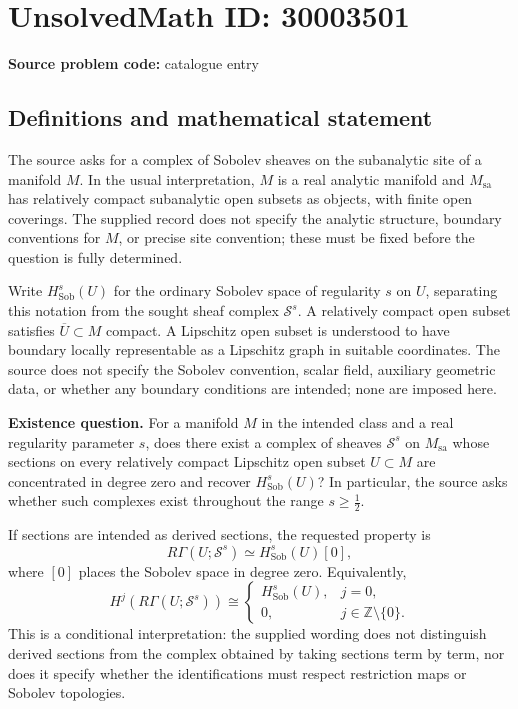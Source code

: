 \documentclass[11pt]{article}
\newcommand{\Z}{\mathbb{Z}}
\begin{document}
\section*{UnsolvedMath ID: 30003501}
\textbf{Source problem code:} catalogue entry
\subsection{Definitions and mathematical statement}
The source asks for a complex of Sobolev sheaves on the subanalytic site of a manifold \(M\). In the usual interpretation, \(M\) is a real analytic manifold and \(M_{\mathrm{sa}}\) has relatively compact subanalytic open subsets as objects, with finite open coverings. The supplied record does not specify the analytic structure, boundary conventions for \(M\), or precise site convention; these must be fixed before the question is fully determined.

Write \(H^s_{\mathrm{Sob}}(U)\) for the ordinary Sobolev space of regularity \(s\) on \(U\), separating this notation from the sought sheaf complex \(\mathcal S^s\). A relatively compact open subset satisfies \(\overline U\subset M\) compact. A Lipschitz open subset is understood to have boundary locally representable as a Lipschitz graph in suitable coordinates. The source does not specify the Sobolev convention, scalar field, auxiliary geometric data, or whether any boundary conditions are intended; none are imposed here.

\textbf{Existence question.} For a manifold \(M\) in the intended class and a real regularity parameter \(s\), does there exist a complex of sheaves \(\mathcal S^s\) on \(M_{\mathrm{sa}}\) whose sections on every relatively compact Lipschitz open subset \(U\subset M\) are concentrated in degree zero and recover \(H^s_{\mathrm{Sob}}(U)\)? In particular, the source asks whether such complexes exist throughout the range \(s\geq\tfrac12\).

If sections are intended as derived sections, the requested property is
\[
R\Gamma(U;\mathcal S^s)\simeq H^s_{\mathrm{Sob}}(U)[0],
\]
where \([0]\) places the Sobolev space in degree zero. Equivalently,
\[
H^j\!\left(R\Gamma(U;\mathcal S^s)\right)\cong
\begin{cases}
H^s_{\mathrm{Sob}}(U),&j=0,\\
0,&j\in\Z\setminus\{0\}.
\end{cases}
\]
This is a conditional interpretation: the supplied wording does not distinguish derived sections from the complex obtained by taking sections term by term, nor does it specify whether the identifications must respect restriction maps or Sobolev topologies.
\end{document}
